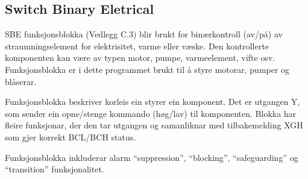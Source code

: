 \newpage

\subsection{Switch Binary Eletrical} 

\gls{SBE} funksjonsblokka (Vedlegg C.3) blir brukt for binærkontroll (av/på) av straumningselement for elektrisitet, varme eller væske. Den
kontrollerte komponenten kan være av typen motor, pumpe, varmeelement, vifte osv.
Funksjonsblokka er i dette programmet brukt til å styre motorar, pumper og blåserar.

Funksjonsblokka beskriver korleis ein styrer ein komponent.
Det er utgangen Y, som sender ein opne/stenge kommando (høg/lav) til komponenten. Blokka har fleire funksjonar, der den
tar utgangen og samanliknar med tilbakemelding \gls{XGH} som gjer korrekt \gls{BCL}/\gls{BCH} status. 

Funksjonsblokka inkluderar alarm ``suppression'', ``blocking'', ``safeguarding'' og ``transition'' funksjonalitet.

